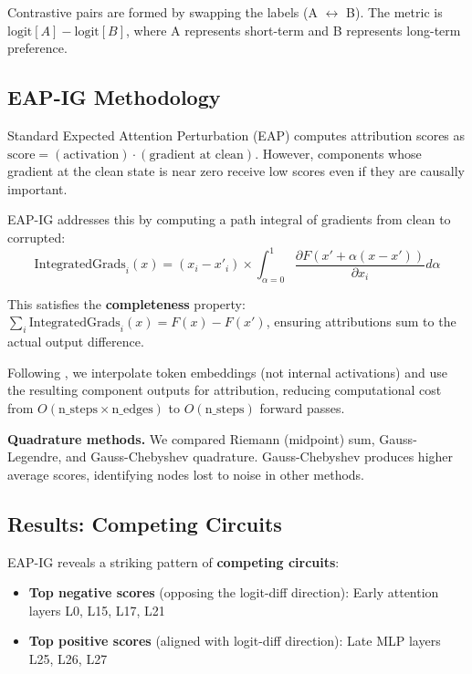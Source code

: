 \documentclass{article}
\begin{document}
Contrastive pairs are formed by swapping the labels (A $\leftrightarrow$ B). The metric is $\text{logit}[A] - \text{logit}[B]$, where A represents short-term and B represents long-term preference.

\subsection{EAP-IG Methodology}

Standard Expected Attention Perturbation (EAP) computes attribution scores as $\text{score} = (\text{activation}) \cdot (\text{gradient at clean})$. However, components whose gradient at the clean state is near zero receive low scores even if they are causally important.

EAP-IG addresses this by computing a path integral of gradients from clean to corrupted:
\begin{equation}
\text{IntegratedGrads}_i(x) = (x_i - x'_i) \times \int_{\alpha=0}^{1} \frac{\partial F(x' + \alpha(x - x'))}{\partial x_i} d\alpha
\end{equation}

This satisfies the \textbf{completeness} property: $\sum_i \text{IntegratedGrads}_i(x) = F(x) - F(x')$, ensuring attributions sum to the actual output difference.

Following \citet{syed2023attribution}, we interpolate token embeddings (not internal activations) and use the resulting component outputs for attribution, reducing computational cost from $O(\text{n\_steps} \times \text{n\_edges})$ to $O(\text{n\_steps})$ forward passes.

\textbf{Quadrature methods.} We compared Riemann (midpoint) sum, Gauss-Legendre, and Gauss-Chebyshev quadrature. Gauss-Chebyshev produces higher average scores, identifying nodes lost to noise in other methods.

\subsection{Results: Competing Circuits}

EAP-IG reveals a striking pattern of \textbf{competing circuits}:

\begin{itemize}
    \item \textbf{Top negative scores} (opposing the logit-diff direction): Early attention layers L0, L15, L17, L21
    \item \textbf{Top positive scores} (aligned with logit-diff direction): Late MLP layers L25, L26, L27
\end{itemize}
\end{document}
